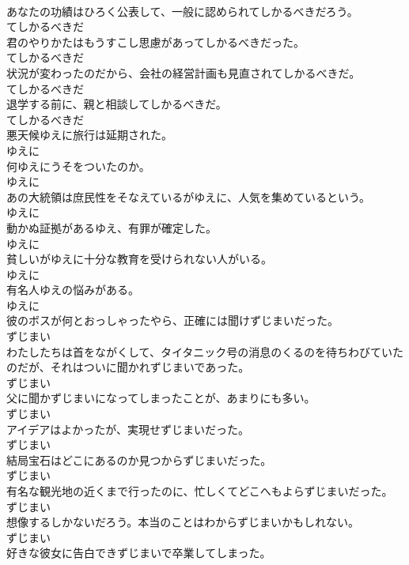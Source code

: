\documentclass[8pt]{extreport}
\begin{document}
\begin{CJK}{UTF8}{min}
\\	あなたの功績はひろく公表して、一般に認められてしかるべきだろう。	
\\	てしかるべきだ	
\\	君のやりかたはもうすこし思慮があってしかるべきだった。	
\\	てしかるべきだ	
\\	状況が変わったのだから、会社の経営計画も見直されてしかるべきだ。	
\\	てしかるべきだ	
\\	退学する前に、親と相談してしかるべきだ。	
\\	てしかるべきだ	
\\	悪天候ゆえに旅行は延期された。	
\\	ゆえに	
\\	何ゆえにうそをついたのか。	
\\	ゆえに	
\\	あの大統領は庶民性をそなえているがゆえに、人気を集めているという。	
\\	ゆえに	
\\	動かぬ証拠があるゆえ、有罪が確定した。	
\\	ゆえに	
\\	貧しいがゆえに十分な教育を受けられない人がいる。	
\\	ゆえに	
\\	有名人ゆえの悩みがある。	
\\	ゆえに	
\\	彼のボスが何とおっしゃったやら、正確には聞けずじまいだった。	
\\	ずじまい	
\\	わたしたちは首をながくして、タイタニック号の消息のくるのを待ちわびていたのだが、それはついに聞かれずじまいであった。	
\\	ずじまい	
\\	父に聞かずじまいになってしまったことが、あまりにも多い。	
\\	ずじまい	
\\	アイデアはよかったが、実現せずじまいだった。	
\\	ずじまい	
\\	結局宝石はどこにあるのか見つからずじまいだった。	
\\	ずじまい	
\\	有名な観光地の近くまで行ったのに、忙しくてどこへもよらずじまいだった。	
\\	ずじまい	
\\	想像するしかないだろう。本当のことはわからずじまいかもしれない。	
\\	ずじまい	
\\	好きな彼女に告白できずじまいで卒業してしまった。	

\end{CJK}
\end{document}
